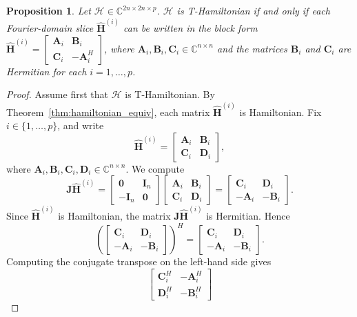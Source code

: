 \documentclass[10pt,a4paper]{amsart}
\newtheorem{proposition}{Proposition}
\newcommand{\C}{\mathbb{C}}         %
\newcommand{\M}[1]{\bm{#1}}     %
\newcommand{\T}[1]{\mathcal{#1}}    %
\begin{document}
\begin{proposition}
\label{prop:T-Hamiltonian}
Let $\T{H} \in \C^{2n \times 2n \times p}$. 
$\T{H}$ is T-Hamiltonian if and only if each Fourier-domain slice $\widehat{\M{H}}^{(i)}$ can be written in the block form $\widehat{\M{H}}^{(i)} = \begin{bmatrix} \M{A}_i & \M{B}_i \\ \M{C}_i & -\M{A}_i^H \end{bmatrix}$, where $\M{A}_i, \M{B}_i, \M{C}_i \in \C^{n \times n}$ and the matrices $\M{B}_i$ and $\M{C}_i$ are Hermitian for each $i=1, \dots, p$.
\end{proposition}

\begin{proof}
Assume first that $\T{H}$ is T-Hamiltonian. By Theorem~\ref{thm:hamiltonian_equiv}, each matrix $\widehat{\M{H}}^{(i)}$ is Hamiltonian. Fix $i \in \{1,\dots,p\}$, and write
$$
\widehat{\M{H}}^{(i)} =
\begin{bmatrix}
\M{A}_i & \M{B}_i \\
\M{C}_i & \M{D}_i
\end{bmatrix},
$$
where $\M{A}_i,\M{B}_i,\M{C}_i,\M{D}_i \in \C^{n\times n}$. We compute
$$
\M{J}\widehat{\M{H}}^{(i)}
=
\begin{bmatrix}
\M{0} & \M{I}_n \\
-\M{I}_n & \M{0}
\end{bmatrix}
\begin{bmatrix}
\M{A}_i & \M{B}_i \\
\M{C}_i & \M{D}_i
\end{bmatrix}
=
\begin{bmatrix}
\M{C}_i & \M{D}_i \\
-\M{A}_i & -\M{B}_i
\end{bmatrix}.
$$
Since $\widehat{\M{H}}^{(i)}$ is Hamiltonian, the matrix $\M{J}\widehat{\M{H}}^{(i)}$ is Hermitian. Hence
$$
\left(
\begin{bmatrix}
\M{C}_i & \M{D}_i \\
-\M{A}_i & -\M{B}_i
\end{bmatrix}
\right)^H
=
\begin{bmatrix}
\M{C}_i & \M{D}_i \\
-\M{A}_i & -\M{B}_i
\end{bmatrix}.
$$
Computing the conjugate transpose on the left-hand side gives
$$
\begin{bmatrix}
\M{C}_i^H & -\M{A}_i^H \\
\M{D}_i^H & -\M{B}_i^H
\end{bmatrix}
$$
\end{proof}
\end{document}

